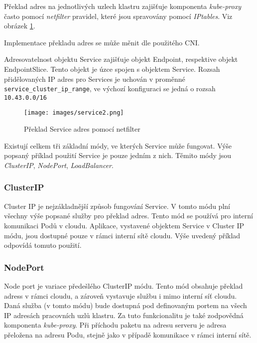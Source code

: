 Překlad adres na jednotlivých uzlech klastru zajišťuje komponenta \textit{kube-proxy} často pomocí \textit{netfilter} pravidel, které jsou spravovány pomocí \textit{IPtables}. Viz obrázek \ref{fig:service2}.

Implementace překladu adres se může měnit dle použitého CNI.

Adresovatelnost objektu Service zajišťuje objekt Endpoint, respektive objekt EndpointSlice. Tento objekt je úzce spojen s objektem Service. Rozsah přidělovaných IP adres pro Services je uchován v proměnné \verb|service_cluster_ip_range|, ve výchozí konfiguraci se jedná o rozsah \verb|10.43.0.0/16| \cite{suserancher_2023_rancher}

\begin{figure}[!ht]
    \centering
    \texttt{[image: images/service2.png]}
    \caption[Překlad Service adres pomocí netfilter]{Překlad Service adres pomocí netfilter \cite{betz_2017_netfilter}}
    \label{fig:service2}
\end{figure}


Existují celkem tři základní módy, ve kterých Service může fungovat. Výše popsaný příklad použití Service je pouze jedním z nich. Těmito módy jsou \textit{ClusterIP}, \textit{NodePort}, 
\textit{LoadBalancer}. \cite{poulton_2022_the}%

\subsubsection{ClusterIP}
Cluster IP je nejzákladnější způsob fungování Service. V tomto módu plní všechny výše popsané služby pro překlad adres. Tento mód se používá pro interní komunikaci Podů v cloudu. Aplikace, vystavené objektem Service v Cluster IP módu, jsou dostupné pouze v rámci interní sítě cloudu. \cite{thekubernetesauthors_2023_service} Výše uvedený příklad odpovídá tomuto použití.

\subsubsection{NodePort}
Node port je variace předešlého ClusterIP módu. Tento mód obsahuje překlad adress v rámci cloudu, a zároveň vystavuje službu i mimo interní síť cloudu. Daná služba (v tomto módu) bude dostupná pod definovaným portem na všech IP adresách pracovních uzlů klastru. Za tuto funkcionalitu je také zodpovědná komponenta \textit{kube-proxy}. Při příchodu paketu na adresu serveru je adresa přeložena na adresu Podu, stejně jako v případě komunikace v rámci interní sítě. \cite{thekubernetesauthors_2023_service}   


